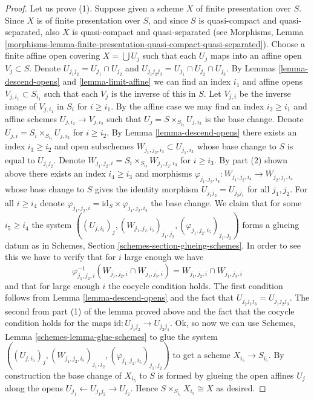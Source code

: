 \begin{proof}
\medskip\noindent
Let us prove (1). Suppose given a scheme $X$ of finite presentation
over $S$. Since $X$ is of finite presentation
over $S$, and since $S$ is quasi-compact and quasi-separated, also
$X$ is quasi-compact and quasi-separated
(see Morphisms,
Lemma \ref{morphisms-lemma-finite-presentation-quasi-compact-quasi-separated}).
Choose a finite affine open covering $X = \bigcup U_j$
such that each $U_j$ maps into an affine open $V_j \subset S$.
Denote $U_{j_1j_2} = U_{j_1} \cap U_{j_2}$ and
$U_{j_1j_2j_3} = U_{j_1} \cap U_{j_2} \cap U_{j_3}$.
By Lemmas \ref{lemma-descend-opens} and \ref{lemma-limit-affine}
we can find an index $i_1$ and affine opens $V_{j, i_1} \subset S_{i_1}$
such that each $V_j$ is the inverse of this in $S$.
Let $V_{j, i}$ be the inverse image of $V_{j, i_1}$ in $S_i$ for
$i \geq i_1$. By the affine case we may find an index $i_2 \geq i_1$ and
affine schemes $U_{j, i_2} \to V_{j, i_2}$ such
that $U_j = S \times_{S_{i_2}} U_{j, i_2}$ is the base change.
Denote $U_{j, i} = S_i \times_{S_{i_2}} U_{j, i_2}$ for $i \geq i_2$.
By Lemma \ref{lemma-descend-opens} there exists an index
$i_3 \geq i_2$ and open subschemes
$W_{j_1, j_2, i_3} \subset U_{j_1, i_3}$
whose base change to $S$ is equal to $U_{j_1j_2}$.
Denote $W_{j_1, j_2, i} = S_i \times_{S_{i_3}} W_{j_1, j_2, i_3}$
for $i \geq i_3$. By part (2) shown above there exists an index
$i_4 \geq i_3$ and morphisms
$\varphi_{j_1, j_2, i_4} : W_{j_1, j_2, i_4} \to W_{j_2, j_1, i_4}$
whose base change to $S$ gives the identity morphism
$U_{j_1j_2} = U_{j_2j_1}$ for all $j_1, j_2$.
For all $i \geq i_4$ denote
$\varphi_{j_1, j_2, i} = \text{id}_S \times \varphi_{j_1, j_2, i_4}$
the base change. We claim that for some $i_5 \geq i_4$ the system
$((U_{j, i_5})_j, (W_{j_1, j_2, i_5})_{j_1,j_2},
(\varphi_{j_1, j_2, i_5})_{j_1,j_2})$ forms a glueing datum
as in Schemes, Section \ref{schemes-section-glueing-schemes}.
In order to see this we have to verify that for $i$ large enough
we have
$$
\varphi_{j_1, j_2, i}^{-1}(W_{j_1, j_2, i} \cap W_{j_1, j_3, i})
=
W_{j_1, j_2, i} \cap W_{j_1, j_3, i}
$$
and that for large enough $i$ the cocycle condition holds.
The first condition follows from Lemma \ref{lemma-descend-opens}
and the fact that $U_{j_2j_1j_3} = U_{j_1j_2j_3}$.
The second from part (1) of the lemma proved above and the fact
that the cocycle condition holds for the maps
$\text{id} : U_{j_1j_2} \to U_{j_2j_1}$.
Ok, so now we can use Schemes, Lemma \ref{schemes-lemma-glue-schemes}
to glue the system
$((U_{j, i_5})_j, (W_{j_1, j_2, i_5})_{j_1,j_2},
(\varphi_{j_1, j_2, i_5})_{j_1,j_2})$ to get a scheme
$X_{i_5} \to S_{i_5}$. By construction the base change of
$X_{i_5}$ to $S$ is formed by glueing the open affines
$U_j$ along the opens $U_{j_1} \leftarrow U_{j_1j_2} \rightarrow U_{j_2}$.
Hence $S \times_{S_{i_5}} X_{i_5} \cong X$ as desired.
\end{proof}

